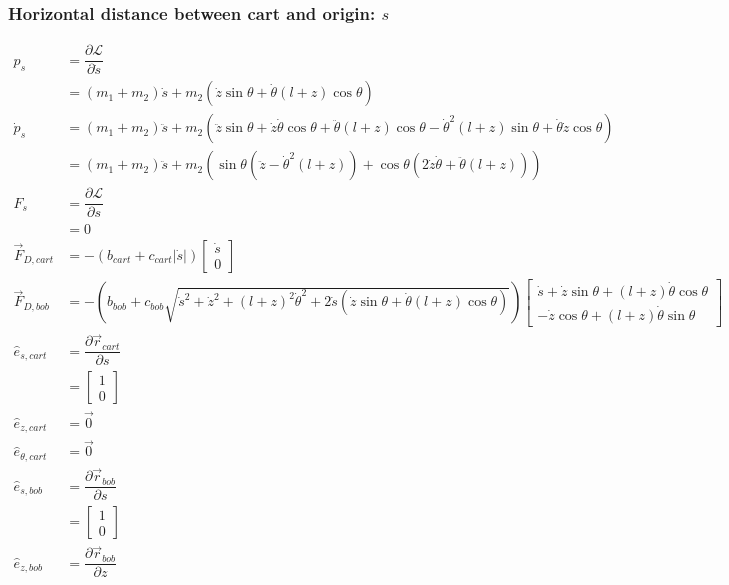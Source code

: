 \documentclass[12pt,a4paper,portrait]{article}
\newcommand{\lag}{\mathcal{L}}
\begin{document}
\subsubsection{Horizontal distance between cart and origin: $s$}
\begin{align*}
	p_s &= \dfrac{\partial \lag}{\partial \dot{s}} \\
	&= (m_1+m_2)\dot{s} + m_2(\dot{z}\sin{\theta} + \dot{\theta}(l+z)\cos{\theta}) \\
	\dot{p}_s &= (m_1+m_2)\ddot{s} + m_2(\ddot{z}\sin{\theta}+\dot{z}\dot{\theta}\cos{\theta}+\ddot{\theta}(l+z)\cos{\theta}-\dot{\theta}^2(l+z)\sin{\theta}+\dot{\theta}\dot{z}\cos{\theta}) \\
	&= (m_1+m_2)\ddot{s} + m_2(\sin{\theta}(\ddot{z}-\dot{\theta}^2(l+z))+\cos{\theta}(2\dot{z}\dot{\theta}+\ddot{\theta}(l+z)))\\
	F_{s} &= \dfrac{\partial \lag}{\partial s} \\
	&= 0 \\
	\vec{F}_{D,cart} &= -(b_{cart}+c_{cart}|\dot{s}|)\begin{bmatrix}
		\dot{s}\\
		0
	\end{bmatrix} \\
	\vec{F}_{D,bob} &= -(b_{bob}+c_{bob}\sqrt{\dot{s}^2 + \dot{z}^2 + (l+z)^2\dot{\theta}^2 + 2\dot{s}(\dot{z}\sin{\theta} + \dot{\theta}(l+z)\cos{\theta})})\begin{bmatrix}
		\dot{s} + \dot{z}\sin{\theta} + (l+z)\dot{\theta}\cos{\theta} \\
		-\dot{z}\cos{\theta} + (l+z)\dot{\theta}\sin{\theta}
	\end{bmatrix} \\
	\hat{e}_{s, cart} &= \dfrac{\partial \vec{r}_{cart}}{\partial s} \\
	&= \begin{bmatrix}
		1 \\
		0
	\end{bmatrix} \\
	\hat{e}_{z, cart} &= \vec{0} \\
	\hat{e}_{\theta, cart} &= \vec{0} \\
	\hat{e}_{s, bob} &= \dfrac{\partial \vec{r}_{bob}}{\partial s} \\
	&= \begin{bmatrix}
		1 \\
		0
	\end{bmatrix} \\
	\hat{e}_{z, bob} &= \dfrac{\partial \vec{r}_{bob}}{\partial z} \\

\end{align*}
\end{document}
